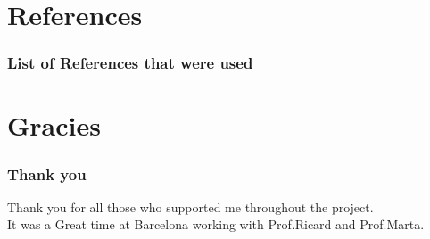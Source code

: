 \documentclass{beamer}
\begin{document}
\section{References}

\frame
{
	\frametitle{List of References that were used}


{}
}
\section{Gracies}

\frame
{
	\frametitle{Thank you}
Thank you for all those who supported me throughout the project.\\
It was a Great time at Barcelona working with Prof.Ricard and Prof.Marta.

}
\end{document}
